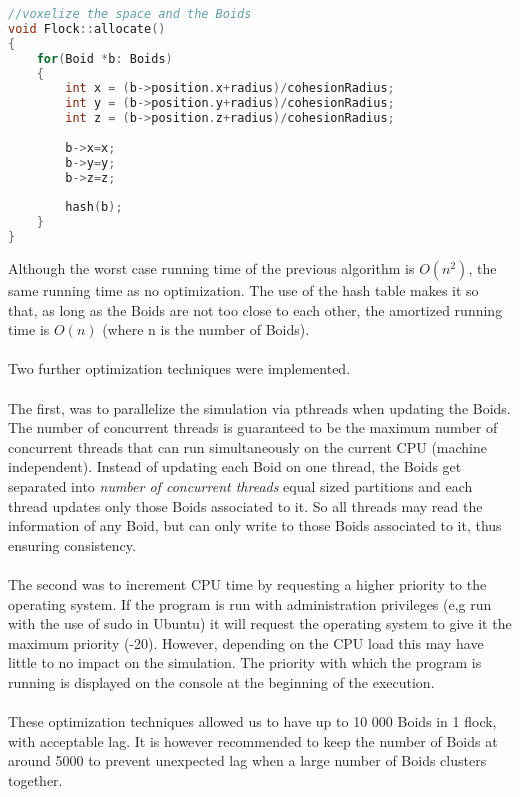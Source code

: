 \documentclass[12pt]{article}
\begin{document}
\begin{minipage}[t]{\textwidth}
\begin{lstlisting}[language=C++]
//voxelize the space and the Boids
void Flock::allocate()
{
	for(Boid *b: Boids)
	{
		int x = (b->position.x+radius)/cohesionRadius;
		int y = (b->position.y+radius)/cohesionRadius;
		int z = (b->position.z+radius)/cohesionRadius;
		
		b->x=x;
		b->y=y;
		b->z=z;
		
		hash(b);
	}
}
\end{lstlisting}
\end{minipage}

Although the worst case running time of the previous algorithm is $O(n^2)$, the same running time as no optimization. The use of the hash table makes it so that, as long as the Boids are not too close to each other, the amortized running time is $O(n)$ (where n is the number of Boids).
\\ \\

Two further optimization techniques were implemented. 
\\ \\
The first, was to parallelize the simulation via pthreads when updating the Boids. The number of concurrent threads is guaranteed to be the maximum number of concurrent threads that can run simultaneously on the current CPU (machine independent). Instead of updating each Boid on one thread, the Boids get separated into \textit{number of concurrent threads} equal sized partitions and each thread updates only those Boids associated to it. So all threads may read the information of any Boid, but can only write to those Boids associated to it, thus ensuring consistency.
\\ \\
The second was to increment CPU time by requesting a higher priority to the operating system. If the program is run with administration privileges (e,g run with the use of sudo in Ubuntu) it will request the operating system to give it the maximum priority (-20). However, depending on the CPU load this may have little to no impact on the simulation. The priority with which the program is running is displayed on the console at the beginning of the execution.
\\ \\
These optimization techniques allowed us to have up to 10 000 Boids in 1 flock, with acceptable lag. It is however recommended to keep the number of Boids at around 5000 to prevent unexpected lag when a large number of Boids clusters together.
\end{document}
